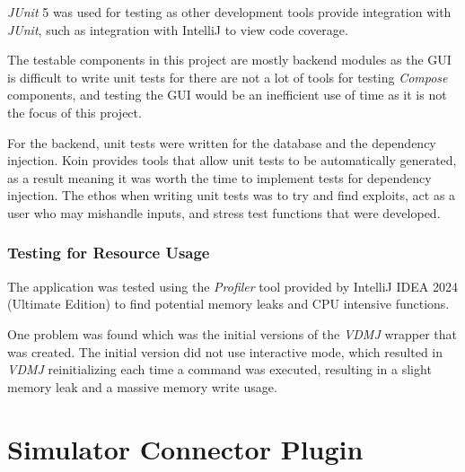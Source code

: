 \documentclass[../dissertation.tex]{subfiles}
\begin{document}
\textit{JUnit} 5 was used for testing as other development tools provide integration with
\textit{JUnit}, such as integration with IntelliJ to view code coverage.

The testable components in this project are mostly backend modules as the
GUI is difficult to write unit tests for there are not a lot of tools
for testing \textit{Compose} components, and testing the GUI would be an
inefficient use of time as it is not the focus of this project.

For the backend, unit tests were written for the database and
the dependency injection.
Koin provides tools that allow unit tests to be
automatically generated, as a result meaning it was worth the time to implement
tests for dependency injection.
The ethos when writing unit tests was to try and find exploits, act as a user who
may mishandle inputs, and stress test functions that were developed.


\subsubsection{Testing for Resource Usage}

The application was tested using the \textit{Profiler} tool provided by
IntelliJ IDEA 2024 (Ultimate Edition) to find potential memory leaks and
CPU intensive functions.

One problem was found which was the initial versions of the \textit{VDMJ} wrapper that was
created. The initial version did not use interactive mode, which resulted in
\textit{VDMJ} reinitializing each time a command was executed, resulting in a slight
memory leak and a massive memory write usage.



\section{Simulator Connector Plugin}
\end{document}

